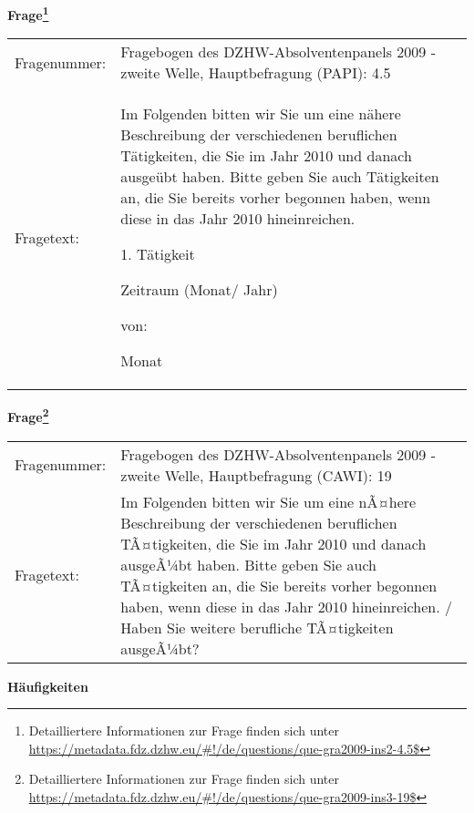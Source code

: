 				\vspace*{0.5cm}
                \noindent\textbf{Frage\footnote{Detailliertere Informationen zur Frage finden sich unter
		              \url{https://metadata.fdz.dzhw.eu/\#!/de/questions/que-gra2009-ins2-4.5$}}}\\
				\begin{tabularx}{\hsize}{@{}lX}
					Fragenummer: &
					  Fragebogen des DZHW-Absolventenpanels 2009 - zweite Welle, Hauptbefragung (PAPI):
					  4.5
 \\
					Fragetext: & Im Folgenden bitten wir Sie um eine nähere Beschreibung der verschiedenen beruflichen Tätigkeiten, die Sie im Jahr 2010 und danach ausgeübt haben. Bitte geben Sie auch Tätigkeiten an, die Sie bereits vorher begonnen haben, wenn diese in das Jahr 2010 hineinreichen.\par  1. Tätigkeit\par  Zeitraum (Monat/ Jahr)\par  von:\par  Monat \\
				\end{tabularx}
				\vspace*{0.5cm}
                \noindent\textbf{Frage\footnote{Detailliertere Informationen zur Frage finden sich unter
		              \url{https://metadata.fdz.dzhw.eu/\#!/de/questions/que-gra2009-ins3-19$}}}\\
				\begin{tabularx}{\hsize}{@{}lX}
					Fragenummer: &
					  Fragebogen des DZHW-Absolventenpanels 2009 - zweite Welle, Hauptbefragung (CAWI):
					  19
 \\
					Fragetext: & Im Folgenden bitten wir Sie um eine nÃ¤here Beschreibung der verschiedenen beruflichen TÃ¤tigkeiten, die Sie im Jahr 2010 und danach ausgeÃ¼bt haben. Bitte geben Sie auch TÃ¤tigkeiten an, die Sie bereits vorher begonnen haben, wenn diese in das Jahr 2010 hineinreichen. / Haben Sie weitere berufliche TÃ¤tigkeiten ausgeÃ¼bt? \\
				\end{tabularx}





        		\vspace*{0.5cm}
                \noindent\textbf{Häufigkeiten}

